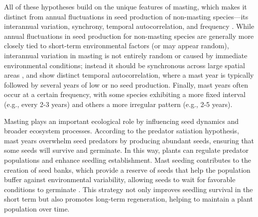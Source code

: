 \documentclass[11pt,letter]{article}
\begin{document}
All of these hypotheses build on the unique features of masting, which makes it distinct from annual fluctuations in seed production of non-masting species---its interannual variation, synchrony, temporal autocorrelation, and frequency \citep{hacket2021climate}. While annual fluctuations in seed production for non-masting species are generally more closely tied to short-term environmental factors (or may appear random), interannual variation in masting is not entirely random or caused by immediate environmental conditions; instead it should be synchronous across large spatial areas \citep[e.g., hundreds of kilometers,][]{kelly1994evolutionary}, and show distinct temporal autocorrelation, where a mast year is typically followed by several years of low or no seed production. Finally, mast years often occur at a certain frequency, with some species exhibiting a more fixed interval (e.g., every 2-3 years) and others a more irregular pattern (e.g., 2-5 years). \par
Masting plays an important ecological role by influencing seed dynamics and broader ecosystem processes. According to the predator satiation hypothesis, mast years overwhelm seed predators by producing abundant seeds, ensuring that some seeds will survive and germinate. In this way, plants can regulate predator populations and enhance seedling establishment. Mast seeding contributes to the creation of seed banks, which provide a reserve of seeds that help the population buffer against environmental variability, allowing seeds to wait for favorable conditions to germinate \citep{venable1989modeling}. This strategy not only improves seedling survival in the short term but also promotes long-term regeneration, helping to maintain a plant population over time.\par
\end{document}
